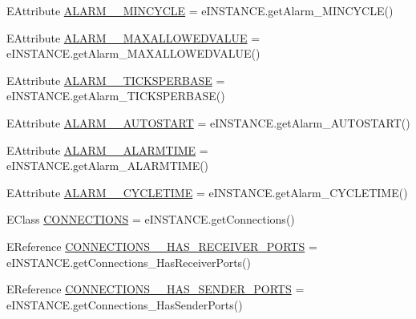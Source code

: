 \begin{DoxyCompactItemize}
E\-Attribute \hyperlink{interfaceshootingmachineemfmodel_1_1_shootingmachineemfmodel_package_1_1_literals_af6054f8b507a7d0ca60b2bd50a5aa084}{A\-L\-A\-R\-M\-\_\-\-\_\-\-M\-I\-N\-C\-Y\-C\-L\-E} = e\-I\-N\-S\-T\-A\-N\-C\-E.\-get\-Alarm\-\_\-\-M\-I\-N\-C\-Y\-C\-L\-E()
\item 
E\-Attribute \hyperlink{interfaceshootingmachineemfmodel_1_1_shootingmachineemfmodel_package_1_1_literals_ac3fcd2fabc29d8b2bd8fe7c20e77a35c}{A\-L\-A\-R\-M\-\_\-\-\_\-\-M\-A\-X\-A\-L\-L\-O\-W\-E\-D\-V\-A\-L\-U\-E} = e\-I\-N\-S\-T\-A\-N\-C\-E.\-get\-Alarm\-\_\-\-M\-A\-X\-A\-L\-L\-O\-W\-E\-D\-V\-A\-L\-U\-E()
\item 
E\-Attribute \hyperlink{interfaceshootingmachineemfmodel_1_1_shootingmachineemfmodel_package_1_1_literals_a39b5fb0f41af6418c8fce9f9311d818d}{A\-L\-A\-R\-M\-\_\-\-\_\-\-T\-I\-C\-K\-S\-P\-E\-R\-B\-A\-S\-E} = e\-I\-N\-S\-T\-A\-N\-C\-E.\-get\-Alarm\-\_\-\-T\-I\-C\-K\-S\-P\-E\-R\-B\-A\-S\-E()
\item 
E\-Attribute \hyperlink{interfaceshootingmachineemfmodel_1_1_shootingmachineemfmodel_package_1_1_literals_a18cfa31e4eebfe9cb41fabca8febd495}{A\-L\-A\-R\-M\-\_\-\-\_\-\-A\-U\-T\-O\-S\-T\-A\-R\-T} = e\-I\-N\-S\-T\-A\-N\-C\-E.\-get\-Alarm\-\_\-\-A\-U\-T\-O\-S\-T\-A\-R\-T()
\item 
E\-Attribute \hyperlink{interfaceshootingmachineemfmodel_1_1_shootingmachineemfmodel_package_1_1_literals_a17abebf837e070e79742d36847ad9d59}{A\-L\-A\-R\-M\-\_\-\-\_\-\-A\-L\-A\-R\-M\-T\-I\-M\-E} = e\-I\-N\-S\-T\-A\-N\-C\-E.\-get\-Alarm\-\_\-\-A\-L\-A\-R\-M\-T\-I\-M\-E()
\item 
E\-Attribute \hyperlink{interfaceshootingmachineemfmodel_1_1_shootingmachineemfmodel_package_1_1_literals_a189117454c5bcbfea11c8b4ad0f7c191}{A\-L\-A\-R\-M\-\_\-\-\_\-\-C\-Y\-C\-L\-E\-T\-I\-M\-E} = e\-I\-N\-S\-T\-A\-N\-C\-E.\-get\-Alarm\-\_\-\-C\-Y\-C\-L\-E\-T\-I\-M\-E()
\item 
E\-Class \hyperlink{interfaceshootingmachineemfmodel_1_1_shootingmachineemfmodel_package_1_1_literals_a9c8a1d573b9fd4d43bc01144a0a93f1f}{C\-O\-N\-N\-E\-C\-T\-I\-O\-N\-S} = e\-I\-N\-S\-T\-A\-N\-C\-E.\-get\-Connections()
\item 
E\-Reference \hyperlink{interfaceshootingmachineemfmodel_1_1_shootingmachineemfmodel_package_1_1_literals_a8be91145fa16d8559da3a9e953daa74b}{C\-O\-N\-N\-E\-C\-T\-I\-O\-N\-S\-\_\-\-\_\-\-H\-A\-S\-\_\-\-R\-E\-C\-E\-I\-V\-E\-R\-\_\-\-P\-O\-R\-T\-S} = e\-I\-N\-S\-T\-A\-N\-C\-E.\-get\-Connections\-\_\-\-Has\-Receiver\-Ports()
\item 
E\-Reference \hyperlink{interfaceshootingmachineemfmodel_1_1_shootingmachineemfmodel_package_1_1_literals_a358f29496a0fad25e398d9a212e455a1}{C\-O\-N\-N\-E\-C\-T\-I\-O\-N\-S\-\_\-\-\_\-\-H\-A\-S\-\_\-\-S\-E\-N\-D\-E\-R\-\_\-\-P\-O\-R\-T\-S} = e\-I\-N\-S\-T\-A\-N\-C\-E.\-get\-Connections\-\_\-\-Has\-Sender\-Ports()

\end{DoxyCompactItemize}
